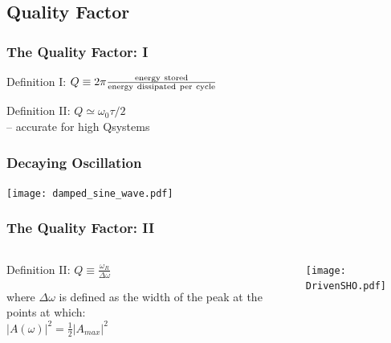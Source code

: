 \documentclass[pdf,hideothersubsections]{beamer}
\begin{document}
\subsection{Quality Factor}
\begin{frame}
\frametitle{The Quality Factor: I}
\pause
\begin{block}{Definition I:}
$Q \equiv 2 \pi \frac{\rm energy~stored}{\rm energy~dissipated~per~cycle}$
\end{block}
\pause
\begin{block}{Definition II:}
$Q \simeq \omega_0 \tau / 2$ \\
-- accurate for high Q\footnotemark systems
\end{block}


\end{frame}

\begin{frame}
\frametitle{Decaying Oscillation}

\centering
\texttt{[image: damped\_sine\_wave.pdf]}

\end{frame}



\begin{frame}
\frametitle{The Quality Factor: II}

\begin{columns}
\begin{column}{0.4\textwidth}
\pause
\begin{block}{Definition II:}
\centering
$Q \equiv \frac{\omega_R}{\Delta \omega}$
\end{block}
\pause
where $\Delta \omega$ is defined as the width of the peak at the
points at which: \\
\centering
$|A(\omega)|^2 = \frac{1}{2} |A_{max}|^2$

\end{column}

\pause
\begin{column}{0.6\textwidth}
\centering
\texttt{[image: DrivenSHO.pdf]}

\end{column}
\end{columns}
\end{frame}
\end{document}
